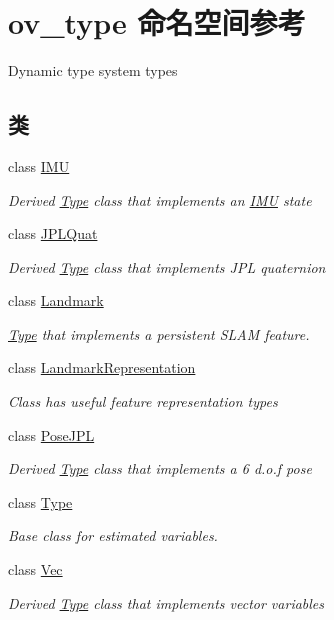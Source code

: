 \hypertarget{namespaceov__type}{}\section{ov\+\_\+type 命名空间参考}
\label{namespaceov__type}


Dynamic type system types  


\subsection*{类}
\begin{DoxyCompactItemize}
\item 
class \hyperlink{classov__type_1_1IMU}{I\+MU}
\begin{DoxyCompactList}\small\item\em Derived \hyperlink{classov__type_1_1Type}{Type} class that implements an \hyperlink{classov__type_1_1IMU}{I\+MU} state \end{DoxyCompactList}\item 
class \hyperlink{classov__type_1_1JPLQuat}{J\+P\+L\+Quat}
\begin{DoxyCompactList}\small\item\em Derived \hyperlink{classov__type_1_1Type}{Type} class that implements J\+PL quaternion \end{DoxyCompactList}\item 
class \hyperlink{classov__type_1_1Landmark}{Landmark}
\begin{DoxyCompactList}\small\item\em \hyperlink{classov__type_1_1Type}{Type} that implements a persistent S\+L\+AM feature. \end{DoxyCompactList}\item 
class \hyperlink{classov__type_1_1LandmarkRepresentation}{Landmark\+Representation}
\begin{DoxyCompactList}\small\item\em Class has useful feature representation types \end{DoxyCompactList}\item 
class \hyperlink{classov__type_1_1PoseJPL}{Pose\+J\+PL}
\begin{DoxyCompactList}\small\item\em Derived \hyperlink{classov__type_1_1Type}{Type} class that implements a 6 d.\+o.\+f pose \end{DoxyCompactList}\item 
class \hyperlink{classov__type_1_1Type}{Type}
\begin{DoxyCompactList}\small\item\em Base class for estimated variables. \end{DoxyCompactList}\item 
class \hyperlink{classov__type_1_1Vec}{Vec}
\begin{DoxyCompactList}\small\item\em Derived \hyperlink{classov__type_1_1Type}{Type} class that implements vector variables \end{DoxyCompactList}\end{DoxyCompactItemize}


